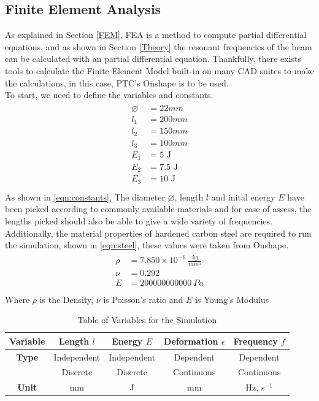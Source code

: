 \documentclass[a4paper,12pt]{article}
\begin{document}
    \subsection{Finite Element Analysis} \label{FEA}%
    As explained in Section \ref{FEM}, FEA is a method to compute partial differential equations, and as shown in Section \ref{Theory} the resonant frequencies of the beam can be calculated with an partial differential equation.
    Thankfully, there exists tools to calculate the Finite Element Model built-in on many CAD suites to make the calculations, in this case, PTC's Onshape is to be used.\\
    To start, we need to define the variables and constants.
    \begin{align}%
    \label{eqn:constants}
    \begin{split}
    \diameter&=22mm\\
    l_{1}&=200mm\\
    l_{2}&=150mm\\
    l_{3}&=100mm\\
    E_{1}&=5\text{ J}\\
    E_{2}&=7.5\text{ J}\\
    E_{3}&=10\text{ J}\\
    \end{split}
    \end{align}
    As shown in \eqref{eqn:constants}, The diameter $\diameter$, length $l$ and inital energy $E$ have been picked according to commonly available materials and for ease of assess, the lengths picked should also be able to give a wide variety of frequencies.
    Additionally, the material properties of hardened carbon steel are required to run the simulation, shown in \eqref{eqn:steel}, these values were taken from Onshape.
    \begin{align}%
    \label{eqn:steel}
    \begin{split}
    \rho&=7.850\times10^{-6}~\frac{kg}{mm^{3}}\\
    \nu&=0.292\\
    E&=200000000000~Pa\\
    \end{split}
    \end{align}
    Where $\rho$ is the Density, $\nu$ is Poisson's ratio and $E$ is Young's Modulus
    \begin{table}[H]%
    \begin{center}
    \begin{tabular}[H]{|c||c|c|c|c|}
    \hline
    \textbf{Variable} & Length $l$ & Energy $E$ & Deformation $\epsilon$ & Frequency $f$ \\
    \hline\hline
    \textbf{Type} & Independent & Independent & Dependent & Dependent \\
    & Discrete & Discrete & Continuous & Continuous \\
    \hline
    \textbf{Unit} & mm & J & mm & Hz, s$^{-1}$ \\
    \hline
    \end{tabular}
    \end{center}
    \caption{Table of Variables for the Simulation}\label{Tab:VarTable}
    \end{table}
\end{document}
